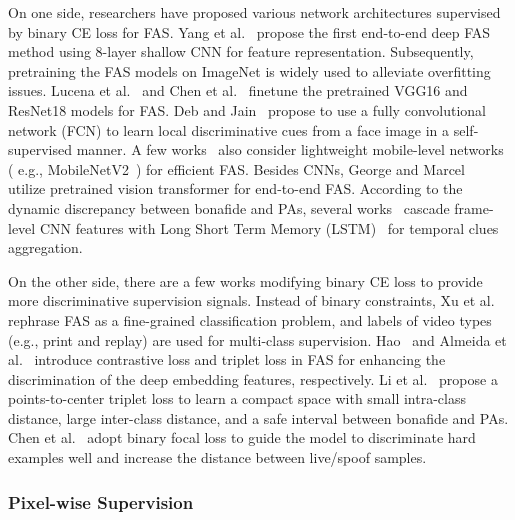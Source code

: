 \documentclass[10pt,journal,compsoc]{IEEEtran}
\begin{document}
On one side, researchers have proposed various network architectures supervised by binary CE loss for FAS. Yang et al.~\cite{yang2014learn} propose the first end-to-end deep FAS method using 8-layer shallow CNN for feature representation. Subsequently, pretraining the FAS models on ImageNet is widely used to alleviate overfitting issues. Lucena et al.~\cite{lucena2017transfer} and Chen et al.~\cite{chen2019attention} finetune the pretrained VGG16 and ResNet18 models for FAS. Deb and Jain~\cite{deb2020look} propose to use a fully convolutional network (FCN) to learn local discriminative cues from a face image in a self-supervised manner. A few works~\cite{heusch2020deep,laurensi2019style} also consider lightweight mobile-level networks ( e.g., MobileNetV2~\cite{sandler2018mobilenetv2}) for efficient FAS. Besides CNNs, George and Marcel~\cite{george2020effectiveness} utilize pretrained vision transformer for end-to-end FAS. According to the dynamic discrepancy between bonafide and PAs, several works~\cite{Xu2016Learning,muhammad2019face,yang2019face,ge2020face} cascade frame-level CNN features with Long Short Term Memory (LSTM)~\cite{hochreiter1997long} for temporal clues aggregation.  

On the other side, there are a few works modifying binary CE loss to provide more discriminative supervision signals. Instead of binary constraints, Xu et al.~\cite{xu2020improving} rephrase FAS as a fine-grained classification problem, and labels of video types (e.g., print and replay) are used for multi-class supervision. Hao~\cite{hao2019face} and Almeida et al.~\cite{almeida2020detecting} introduce contrastive loss and triplet loss in FAS for enhancing the discrimination of the deep embedding features, respectively. Li et al.~\cite{xu2020improving} propose a points-to-center triplet loss to learn a compact space with small intra-class distance, large inter-class distance, and a safe interval between bonafide and PAs. Chen et al.~\cite{chen2021camera} adopt binary focal loss to guide the model to discriminate hard examples well and increase the distance between live/spoof samples.

\subsubsection{Pixel-wise Supervision}
\end{document}
